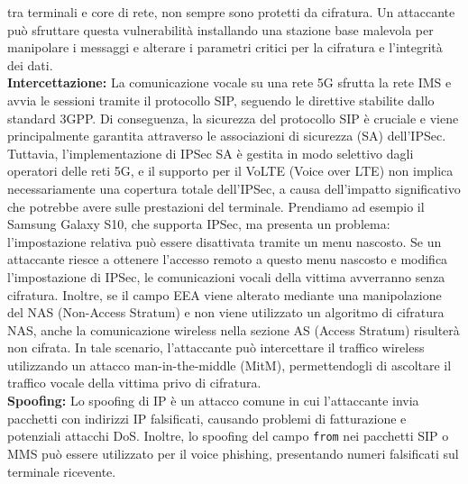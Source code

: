 \documentclass[english]{article}
\begin{document}
tra terminali e core di rete, non sempre sono protetti da cifratura. Un attaccante può
sfruttare questa vulnerabilità installando una stazione base malevola per manipolare i
messaggi e alterare i parametri critici per la cifratura e l'integrità dei dati.
\\[0.2cm]
\textbf{Intercettazione:} La comunicazione vocale su una rete 5G sfrutta la rete IMS e
avvia le sessioni tramite il protocollo SIP, seguendo le direttive stabilite dallo standard 3GPP.
Di conseguenza, la sicurezza del protocollo SIP è cruciale e viene principalmente garantita attraverso
le associazioni di sicurezza (SA) dell'IPSec. Tuttavia, l'implementazione di IPSec SA è
gestita in modo selettivo dagli operatori delle reti 5G, e il supporto per il VoLTE (Voice over LTE)
non implica necessariamente una copertura totale dell'IPSec,
a causa dell'impatto significativo che potrebbe avere sulle prestazioni del terminale.
Prendiamo ad esempio il Samsung Galaxy S10,
che supporta IPSec, ma presenta un problema: l'impostazione relativa può essere disattivata tramite
un menu nascosto. Se un attaccante riesce a ottenere l'accesso remoto a questo menu nascosto e
modifica l'impostazione di IPSec, le comunicazioni vocali della vittima avverranno senza cifratura.
Inoltre, se il campo EEA viene alterato mediante una manipolazione del NAS (Non-Access Stratum)
e non viene utilizzato un algoritmo di cifratura NAS, anche la comunicazione wireless nella
sezione AS (Access Stratum) risulterà non cifrata. In tale scenario, l'attaccante può intercettare
il traffico wireless utilizzando un attacco man-in-the-middle (MitM), permettendogli di ascoltare
il traffico vocale della vittima privo di cifratura.
\\[0.2cm]
\textbf{Spoofing:} Lo spoofing di IP è un attacco comune in cui l'attaccante invia pacchetti
con indirizzi IP falsificati, causando problemi di fatturazione e potenziali attacchi DoS.
Inoltre, lo spoofing del campo \texttt{from} nei pacchetti SIP o MMS può essere utilizzato
per il voice phishing, presentando numeri falsificati sul terminale ricevente.
\end{document}
